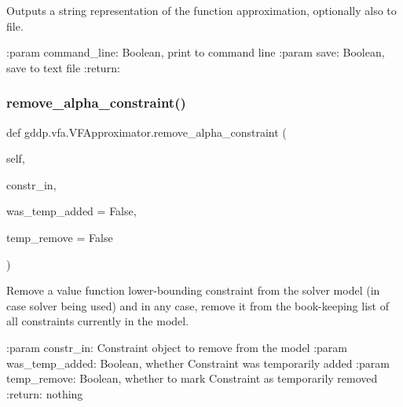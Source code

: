 \begin{DoxyVerb}Outputs a string representation of the function approximation, optionally also to file.

:param command_line: Boolean, print to command line
:param save: Boolean, save to text file
:return:
\end{DoxyVerb}
 \mbox{\label{classgddp_1_1vfa_1_1_v_f_approximator_a171722a3e9865a9eef226025e7a9425b}} 
\subsubsection{\texorpdfstring{remove\_alpha\_constraint()}{remove\_alpha\_constraint()}}
{\footnotesize\ttfamily def gddp.\+vfa.\+V\+F\+Approximator.\+remove\+\_\+alpha\+\_\+constraint (\begin{DoxyParamCaption}\item[{}]{self,  }\item[{}]{constr\+\_\+in,  }\item[{}]{was\+\_\+temp\+\_\+added = {\ttfamily False},  }\item[{}]{temp\+\_\+remove = {\ttfamily False} }\end{DoxyParamCaption})}

\begin{DoxyVerb}Remove a value function lower-bounding constraint from the solver model (in case solver
being used) and in any case, remove it from the book-keeping list of all constraints
currently in the model.

:param constr_in: Constraint object to remove from the model
:param was_temp_added: Boolean, whether Constraint was temporarily added
:param temp_remove: Boolean, whether to mark Constraint as temporarily removed
:return: nothing
\end{DoxyVerb}
 \mbox{\label{classgddp_1_1vfa_1_1_v_f_approximator_afc1eaa9e77b92694ff7deab9ebfc33ed}} 

